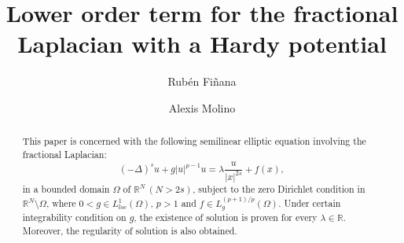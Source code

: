 \documentclass[preprint,12pt]{elsarticle}
\begin{document}
	
	\begin{frontmatter}
		
		
		
		\title{Lower order term for the fractional Laplacian with a Hardy potential}
		
		\author[label 1]{Rub\'en Fi\~nana}
		
		\author[label 2]{Alexis Molino}
		
		
		
		
		
		
		\begin{abstract}
			This paper is concerned with the following semilinear elliptic equation involving the fractional Laplacian: $$(-\Delta)^s u+ g|u|^{p-1}u= \lambda \frac{u}{|x|^{2s}}+f(x),$$ in a bounded domain $\Omega$ of $\mathbb{R}^N\,(N>2s)$, subject to the zero Dirichlet condition in $\mathbb{R}^N\setminus \Omega$, where $0<g\in L_{loc}^1(\Omega)$, $p>1$ and $f\in L^{(p+1)/p}_g(\Omega)$. Under certain integrability  condition on $g$, the existence of solution  is proven for every $\lambda\in \mathbb{R}$. Moreover, the regularity of solution is also obtained.
		\end{abstract}
		

\end{frontmatter}
\end{document}
